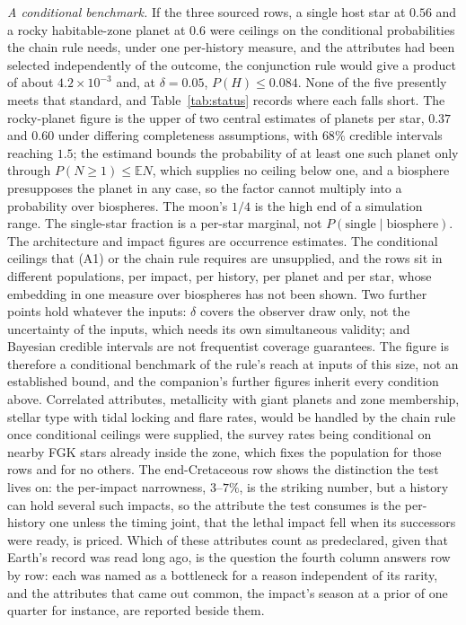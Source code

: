\noindent\textit{A conditional benchmark.} If the three sourced rows, a single host star at $0.56$ \cite{raghavan2010multiplicity} and a rocky habitable-zone planet at $0.6$ \cite{bryson2021eta} were ceilings on the conditional probabilities the chain rule needs, under one per-history measure, and the attributes had been selected independently of the outcome, the conjunction rule would give a product of about $4.2 \times 10^{-3}$ and, at $\delta = 0.05$, $P(H) \le 0.084$. None of the five presently meets that standard, and Table~\ref{tab:status} records where each falls short. The rocky-planet figure is the upper of two central estimates of planets per star, $0.37$ and $0.60$ under differing completeness assumptions, with $68\%$ credible intervals reaching $1.5$; the estimand bounds the probability of at least one such planet only through $P(N \ge 1) \le \mathbb{E}N$, which supplies no ceiling below one, and a biosphere presupposes the planet in any case, so the factor cannot multiply into a probability over biospheres. The moon's $1/4$ is the high end of a simulation range. The single-star fraction is a per-star marginal, not $P(\text{single} \mid \text{biosphere})$. The architecture and impact figures are occurrence estimates. The conditional ceilings that (A1) or the chain rule requires are unsupplied, and the rows sit in different populations, per impact, per history, per planet and per star, whose embedding in one measure over biospheres has not been shown. Two further points hold whatever the inputs: $\delta$ covers the observer draw only, not the uncertainty of the inputs, which needs its own simultaneous validity; and Bayesian credible intervals are not frequentist coverage guarantees. The figure is therefore a conditional benchmark of the rule's reach at inputs of this size, not an established bound, and the companion's further figures inherit every condition above. Correlated attributes, metallicity with giant planets and zone membership, stellar type with tidal locking and flare rates, would be handled by the chain rule once conditional ceilings were supplied, the survey rates being conditional on nearby FGK stars already inside the zone, which fixes the population for those rows and for no others. The end-Cretaceous row shows the distinction the test lives on: the per-impact narrowness, $3$--$7\%$, is the striking number, but a history can hold several such impacts, so the attribute the test consumes is the per-history one unless the timing joint, that the lethal impact fell when its successors were ready, is priced. Which of these attributes count as predeclared, given that Earth's record was read long ago, is the question the fourth column answers row by row: each was named as a bottleneck for a reason independent of its rarity, and the attributes that came out common, the impact's season at a prior of one quarter for instance, are reported beside them.


